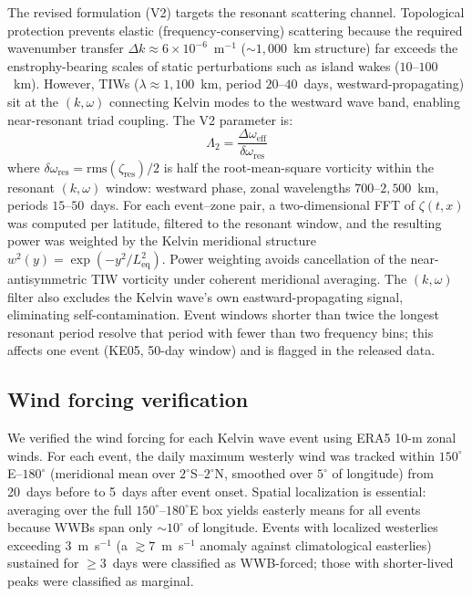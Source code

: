 \documentclass[11pt]{article}
\begin{document}
The revised formulation (V2) targets the resonant scattering channel. Topological protection prevents elastic (frequency-conserving) scattering because the required wavenumber transfer $\Delta k \approx 6 \times 10^{-6}$~m$^{-1}$ (${\sim}1{,}000$~km structure) far exceeds the enstrophy-bearing scales of static perturbations such as island wakes ($10$--$100$~km). However, TIWs ($\lambda \approx 1{,}100$~km, period $20$--$40$~days, westward-propagating) sit at the $(k, \omega)$ connecting Kelvin modes to the westward wave band, enabling near-resonant triad coupling\cite{Lyman2005}. The V2 parameter is:
\begin{equation}
\Lambda_2 = \frac{\Delta\omega_\mathrm{eff}}{\delta\omega_\mathrm{res}}
\label{eq:lambda2}
\end{equation}
where $\delta\omega_\mathrm{res} = \mathrm{rms}(\zeta_\mathrm{res}) / 2$ is half the root-mean-square vorticity within the resonant $(k, \omega)$ window: westward phase, zonal wavelengths $700$--$2{,}500$~km, periods $15$--$50$~days. For each event--zone pair, a two-dimensional FFT of $\zeta(t, x)$ was computed per latitude, filtered to the resonant window, and the resulting power was weighted by the Kelvin meridional structure $w^2(y) = \exp(-y^2 / L_\mathrm{eq}^2)$. Power weighting avoids cancellation of the near-antisymmetric TIW vorticity under coherent meridional averaging. The $(k, \omega)$ filter also excludes the Kelvin wave's own eastward-propagating signal, eliminating self-contamination. Event windows shorter than twice the longest resonant period resolve that period with fewer than two frequency bins; this affects one event (KE05, 50-day window) and is flagged in the released data.

\subsection{Wind forcing verification}

We verified the wind forcing for each Kelvin wave event using ERA5 10-m zonal winds. For each event, the daily maximum westerly wind was tracked within $150^\circ$E--$180^\circ$ (meridional mean over $2^\circ$S--$2^\circ$N, smoothed over $5^\circ$ of longitude) from 20~days before to 5~days after event onset. Spatial localization is essential: averaging over the full $150^\circ$--$180^\circ$E box yields easterly means for all events because WWBs span only ${\sim}10^\circ$ of longitude. Events with localized westerlies exceeding 3~m~s$^{-1}$ (a ${\gtrsim}7$~m~s$^{-1}$ anomaly against climatological easterlies) sustained for $\geq 3$~days were classified as WWB-forced; those with shorter-lived peaks were classified as marginal.
\end{document}
